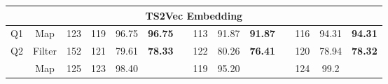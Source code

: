 \begin{table}
\begin{tabular}{cccccclccclccc}
\multicolumn{14}{c}{\textbf{TS2Vec Embedding}}                                                                                                                                                                                                                                                                                                                                                                                                                                                                                                                                                                                                                                                                                   \\ \hline
Q1                              & Map                                 & 123                                   & 119                                                                    & 96.75                                                                     & \textbf{96.75}                  &                      & 113                                                                    & 91.87                                                                     & \textbf{91.87}                  &                      & 116                                                                    & 94.31                                                                     & \textbf{94.31}                  \\ \hline
\multirow{2}{*}{Q2}             & Filter                              & 152                                   & 121                                                                    & 79.61                                                                     & \multirow{2}{*}{\textbf{78.33}} &                      & 122                                                                    & 80.26                                                                     & \multirow{2}{*}{\textbf{76.41}} &                      & 120                                                                    & 78.94                                                                     & \multirow{2}{*}{\textbf{78.32}} \\
                                & Map                                 & 125                                   & 123                                                                    & 98.40                                                                     &                                 & \multicolumn{1}{c}{} & 119                                                                    & 95.20                                                                     &                                 & \multicolumn{1}{c}{} & 124                                                                    & 99.2                                                                      &                                 \\ \hline

\end{tabular}
\end{table}
